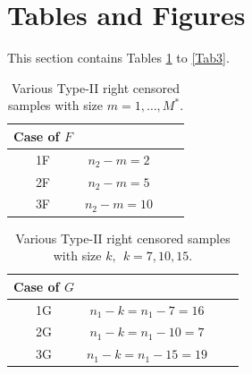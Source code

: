 \documentclass[twoside]{article}
\begin{document}
\section{Tables and Figures}
This section contains  Tables \ref{Tab1} to  \ref{Tab3}.
\begin{table}[h]
\caption{Various Type-II  right censored samples  with size   $m=1,\ldots,M^*$.
}\label{Tab1}
\centering
\begin{tabular}{cccc}\hline\hline
Case of $F$&\\ \hline\hline
1F&$n_2-m=2$\\
2F&$n_2-m=5$\\
3F&$n_2-m=10$\\
\hline\hline
\end{tabular}
\end{table}
\begin{table}[h]
\caption{Various Type-II right censored samples with size $k, \ \ k=7,10,15$. 
}\label{Tab2}
\centering
\begin{tabular}{cccc}\hline\hline
Case of $G$&\\ \hline\hline
1G&$n_1-k=n_1-7=16$\\
2G&$n_1-k=n_1-10=7$\\
3G&$n_1-k=n_1-15=19$\\
\hline\hline
\end{tabular}
\end{table}
\end{document}

